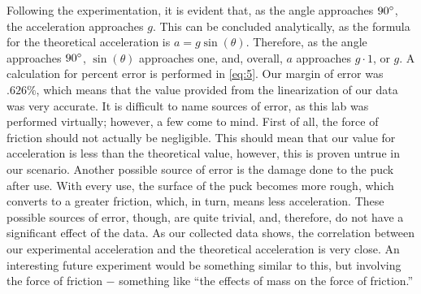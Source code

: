 \documentclass{article}
\begin{document}
\begin{justify}

  Following the experimentation, it is evident that, as the angle approaches $90\degree$, the acceleration approaches $g$. This can be concluded analytically, as the formula for the theoretical acceleration is $a=g\sin(\theta)$. Therefore, as the angle approaches $90\degree$, $\sin(\theta)$ approaches one, and, overall, $a$ approaches $g\cdot1$, or $g$. A calculation for percent error is performed in \eqref{eq:5}. Our margin of error was $.626\%$, which means that the value provided from the linearization of our data was very accurate. It is difficult to name sources of error, as this lab was performed virtually; however, a few come to mind. First of all, the force of friction should not actually be negligible. This should mean that our value for acceleration is less than the theoretical value, however, this is proven untrue in our scenario. Another possible source of error is the damage done to the puck after use. With every use, the surface of the puck becomes more rough, which converts to a greater friction, which, in turn, means less acceleration. These possible sources of error, though, are quite trivial, and, therefore, do not have a significant effect of the data. As our collected data shows, the correlation between our experimental acceleration and the theoretical acceleration is very close. An interesting future experiment would be something similar to this, but involving the force of friction $-$ something like ``the effects of mass on the force of friction.''

\end{justify}
\end{document}
